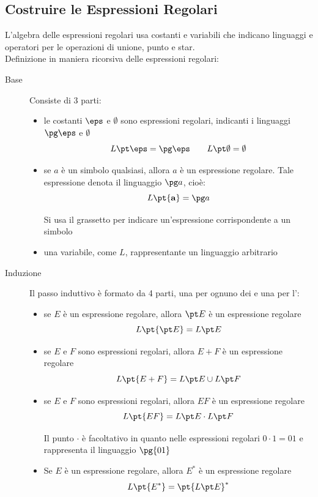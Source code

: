 \subsection{Costruire le Espressioni Regolari}\label{sub:lr_costruire_le_espressioni_regolari} %
L'algebra delle espressioni regolari usa costanti e variabili che indicano linguaggi e operatori per le operazioni di unione, punto e star.
\\
Definizione in maniera ricorsiva delle espressioni regolari:
\begin{description}
    \item[Base] Consiste di 3 parti:
        \begin{itemize}
            \item le costanti $\eps$ e $\emptyset$ sono espressioni regolari, indicanti i linguaggi $\pg\eps$ e $\emptyset$
                \[
                    L\pt\eps = \pg\eps \qquad L\pt\emptyset = \emptyset
                \]
            \item se $a$ è un simbolo qualsiasi, allora $a$ è un espressione regolare.
                Tale espressione denota il linguaggio $\pg a$, cioè:
                \[
                    L\pt{\mathbf{a}} = \pg a
                \]
                \begin{note}
                    Si usa il grassetto per indicare un'espressione corrispondente a un simbolo
                \end{note}
            \item una variabile, come $L$, rappresentante un linguaggio arbitrario
        \end{itemize}
    \item[Induzione] Il passo induttivo è formato da 4 parti, una per ognuno dei  e una per l':
        \begin{itemize}
            \item se $E$ è un espressione regolare, allora $\pt E$ è un espressione regolare
                \[
                    L\pt{\pt E} = L\pt E
                \]
            \item se $E$ e $F$ sono espressioni regolari, allora $E+F$ è un espressione regolare
                \[
                    L\pt{E+F} = L\pt E \cup L\pt F
                \]
            \item se $E$ e $F$ sono espressioni regolari, allora $EF$ è un espressione regolare
                \[
                    L\pt{EF} = L\pt E \cdot L\pt F
                \]
                \begin{note}
                    Il punto $\cdot$ è facoltativo in quanto nelle espressioni regolari $0\cdot1 = 01$ e rappresenta il linguaggio $\pg{01}$
                \end{note}
            \item Se $E$ è un espressione regolare, allora $E^*$ è un espressione regolare
                \[
                    L\pt{E^*} = \pt{L\pt E}^*
                \]
        \end{itemize}
\end{description}
